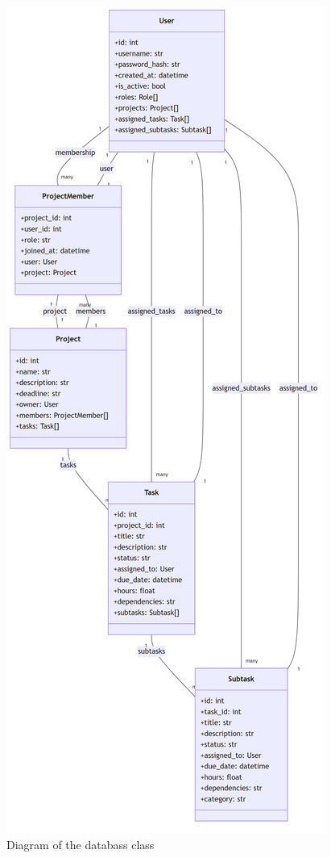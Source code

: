 \documentclass{report}
\begin{document}
\begin{samepage}
    \begin{figure}[h!]
    \centering
    \includegraphics[width=\linewidth,height=\textheight,keepaspectratio]{png_files/db_class_diagram.png}
    \caption{Diagram of the databass class}
        \label{fig:db class diagram}
    \end{figure}
\end{samepage}
\end{document}
